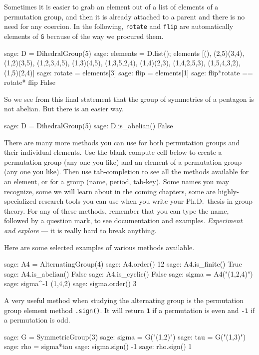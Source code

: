 %
%
Sometimes it is easier to grab an element out of a list of elements of a permutation group, and then it is already attached to a parent and there is no need for any coercion.  In the following, \verb?rotate? and \verb?flip? are automatically elements of \verb?G? because of the way we procured them.
%
\begin{sageexample}
sage: D = DihedralGroup(5)
sage: elements = D.list(); elements
[(), (2,5)(3,4), (1,2)(3,5), (1,2,3,4,5), (1,3)(4,5),
(1,3,5,2,4), (1,4)(2,3), (1,4,2,5,3), (1,5,4,3,2), (1,5)(2,4)]
sage: rotate = elements[3]
sage: flip = elements[1]
sage: flip*rotate == rotate* flip
False
\end{sageexample}
%
So we see from this final statement that the group of symmetries of a pentagon is not abelian.  But there is an easier way.
%
\begin{sageexample}
sage: D = DihedralGroup(5)
sage: D.is_abelian()
False
\end{sageexample}
%
There are many more methods you can use for both permutation groups and their individual elements.  Use the blank compute cell below to create a permutation group (any one you like) and an element of a permutation group (any one you like).  Then use tab-completion to see all the methods available for an element, or for a group (name, period, tab-key).  Some names you may recognize, some we will learn about in the coming chapters, some are highly-specialized research tools you can use when you write your Ph.D.\ thesis in group theory.  For any of these methods, remember that you can type the name, followed by a question mark, to see documentation and examples.  \emph{Experiment and explore} --- it is really hard to break anything.\par
%
\begin{sageverbatim}
\end{sageverbatim}
%
Here are some selected examples of various methods available.
%
\begin{sageexample}
sage: A4 = AlternatingGroup(4)
sage: A4.order()
12
sage: A4.is_finite()
True
sage: A4.is_abelian()
False
sage: A4.is_cyclic()
False
sage: sigma = A4("(1,2,4)")
sage: sigma^-1
(1,4,2)
sage: sigma.order()
3
\end{sageexample}
%
A very useful method when studying the alternating group is the permutation group element method \verb?.sign()?.  It will return \verb?1? if a permutation is even and \verb?-1? if a permutation is odd.
%
\begin{sageexample}
sage: G = SymmetricGroup(3)
sage: sigma = G("(1,2)")
sage: tau = G("(1,3)")
sage: rho = sigma*tau
sage: sigma.sign()
-1
sage: rho.sign()
1
\end{sageexample}
